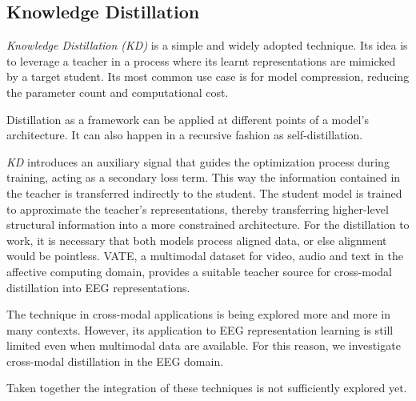 \subsection{Knowledge Distillation}
\textit{Knowledge Distillation (KD)} is a simple and widely adopted technique.
Its idea is to leverage a teacher in a process where its learnt representations are mimicked by a target student.
Its most common use case is for model compression, reducing the parameter count and computational cost.

Distillation as a framework can be applied at different points of a model's architecture.
It can also happen in a recursive fashion as self-distillation.

\textit{KD} introduces an auxiliary signal that guides the optimization process during training, acting as a secondary loss term.
This way the information contained in the teacher is transferred indirectly to the student.
The student model is trained to approximate the teacher’s representations, thereby transferring higher-level structural information into a more constrained architecture.
For the distillation to work, it is necessary that both models process aligned data, or else alignment would be pointless.
VATE\cite{10.1007/978-3-031-91575-8_13}, a multimodal dataset for video, audio and text in the affective computing domain, provides a suitable teacher source for cross-modal distillation into EEG representations.

The technique in cross-modal applications is being explored more and more in many contexts.
However, its application to EEG representation learning is still limited even when multimodal data are available.
For this reason, we investigate cross-modal distillation in the EEG domain.


Taken together the integration of these techniques is not sufficiently explored yet.
